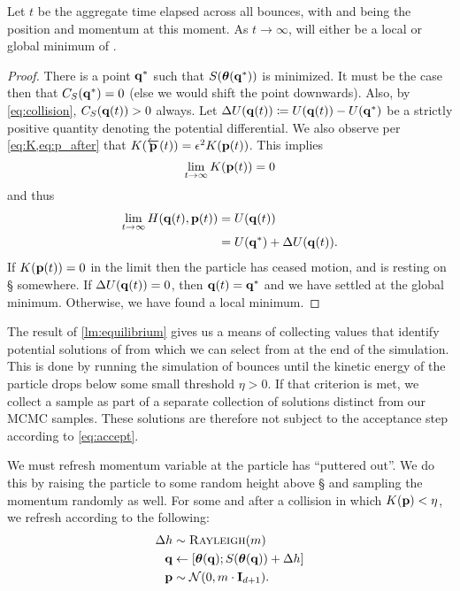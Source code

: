 \begin{lemma}
    \label{lm:equilibrium}
    Let $t$ be the aggregate time elapsed across all bounces, with \qt{} and
    \pt{} being the position and momentum at this moment. As $t \rightarrow
    \infty$, \thetaof{\qt{}} will either be a local or global minimum of
    \surface{}.
\end{lemma}
\begin{proof}
    There is a point $\mathbf{q}{}^*$ such that $S(\boldsymbol{\theta}(\mathbf{q}{}^*))$ is minimized.
    It must be the case then that $C_{S}({\mathbf{q}{}^*}) = 0$ (else we would shift the
    point downwards). Also, by \cref{eq:collision}, $C_{S}({\mathbf{q}(t){}}) > 0$ always.
    Let $\Delta U(\mathbf{q}(t){}) \coloneqq U(\mathbf{q}(t){}) - U(\mathbf{q}{}^*)$ be a strictly positive
    quantity denoting the potential differential. We also observe per
    \cref{eq:K,eq:p_after} that $K(\overleftarrow{\mathbf{p}}(t)) = \epsilon^2
    K(\mathbf{p}(t){})$. This implies
    \begin{equation*}
        \lim_{t \rightarrow \infty} K(\mathbf{p}(t){}) = 0
    \end{equation*}
    and thus
    \begin{align*}
        \lim_{t \rightarrow \infty} H(\mathbf{q}(t){}, \mathbf{p}(t){}) &= U(\mathbf{q}(t){}) \\
        &= U(\mathbf{q}{}^*) + \Delta U(\mathbf{q}(t){}).
    \end{align*}
    If $K(\mathbf{p}(t){}) = 0$ in the limit then the particle has ceased motion, and is
    resting on \S{} somewhere. If $\Delta U(\mathbf{q}(t){}) = 0$, then $\mathbf{q}(t){} = \mathbf{q}{}^*$
    and we have settled at the global minimum. Otherwise, we have found a local
    minimum.
\end{proof}

The result of \cref{lm:equilibrium} gives us a means of collecting values
\thetab{} that identify potential solutions of \target{} from which we can
select from at the end of the simulation. This is done by running the simulation
of bounces until the kinetic energy of the particle drops below some small
threshold $\eta > 0$. If that criterion is met, we collect a sample as part of a
separate collection of solutions distinct from our MCMC samples. These solutions
are therefore not subject to the acceptance step according to \cref{eq:accept}.

We must refresh momentum variable at the particle has ``puttered out''. We do
this by raising the particle to some random height above \S{} and sampling the
momentum randomly as well. For some \q{} and \p{} after a collision in which
$K(\mathbf{p}{}) < \eta$, we refresh according to the following:
\begin{align}
    \Delta h &\sim \textsc{Rayleigh}(m) \\
    \mathbf{q}{} &\gets [\boldsymbol{\theta}(\mathbf{q}); S(\boldsymbol{\theta}(\mathbf{q})) + \Delta h] \\
    \mathbf{p}{} &\sim \mathcal{N}(0,m \cdot \mathbf{I}_{d+1}).
\end{align}

